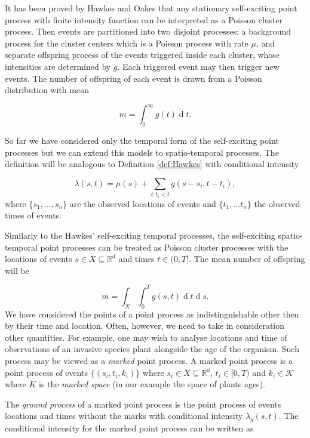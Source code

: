 \documentclass[11pt,a4paper]{article}
\renewcommand{\d}[1]{\ensuremath{\operatorname{d}\!{#1}}}
\begin{document}
It has been proved by Hawkes and Oakes \cite{Hawkes74} that any stationary self-exciting point process with finite intensity function can be interpreted as a Poisson cluster process. Then events are partitioned into two disjoint processes: a background process for the cluster centers which is a Poisson process with rate $\mu$, and separate offspring process of the events triggered inside each cluster, whose intensities are determined by $g$. Each triggered event may then trigger new events. The number of offspring of each event is drawn from a Poisson distribution with mean 

\begin{equation*}
    m = \int_0^\infty g(t) \d t.
\end{equation*}

So far we have considered only the temporal form of the self-exciting point processes but we can extend this models to spatio-temporal processes. The definition will be analogous to Definition \ref{def:Hawkes} with conditional intensity

\begin{equation*}
    \lambda(s, t) = \mu(s) + \sum_{i:t_i<t} g(s - s_i, t - t_i),
\end{equation*}
where $\{ s_1, \dots, s_n \}$ are the observed locations of events and $\{t_1, \dots t_n \}$ the observed times of events. 

Similarly to the Hawkes' self-exciting temporal processes, the self-exciting spatio-temporal point processes can be treated as Poisson cluster processes with the locations of events $s \in X \subseteq \mathbb{R}^d$ and times $t \in (0, T]$. The mean number of offspring will be

\begin{equation}\label{eq:meanoffsp}
    m = \int_X \int_0^T g(s, t) \d t \d s.
\end{equation}
We have considered the points of a point process as indistinguishable other then by their time and location. Often, however, we need to take in consideration other quantities. For example, one may wish to analyse locations and time of observations of an invasive species plant alongside the age of the organism. Such process may be viewed as a \textit{marked} point process. A marked point process is a point process of events $\{ (s_i, t_i, k_i ) \}$ where  $s_i \in X \subseteq \mathbb{R^d}$, $t_i \in [0, T)$ and $k_i \in \mathcal{K}$ where $K$ is the \textit{marked space} (in our example the space of plants ages).

The \textit{ground process} of a marked point process is the point process of events locations and times without the marks with conditional intensity $\lambda_g(s, t)$. The conditional intensity for the marked point process can be written as
\end{document}

